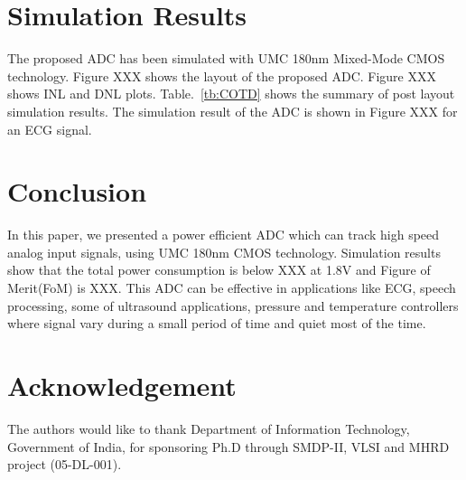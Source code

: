 \documentclass[conference]{IEEEtran}
\begin{document}
\section{Simulation Results}

	The proposed ADC has been simulated with UMC 180nm Mixed-Mode CMOS technology. Figure XXX shows the layout of the proposed ADC. Figure XXX shows INL and DNL plots. Table.~\ref{tb:COTD} shows the summary of post layout simulation results. The simulation result of the ADC is shown in Figure XXX for an ECG signal. 



\section{Conclusion}
	In this paper, we presented a power efficient ADC which can track high speed analog input signals, using UMC 180nm CMOS technology. Simulation results show that the total power consumption is below XXX at 1.8V and Figure of Merit(FoM) is XXX. This ADC can be effective in applications like ECG, speech processing, some of ultrasound applications, pressure and temperature controllers where signal vary during a small period of time and quiet most of the time. \par



\section*{Acknowledgement}
The authors would like to thank Department of Information Technology, Government of India, for sponsoring Ph.D through SMDP-II, VLSI and MHRD project (05-DL-001).



\end{document}
